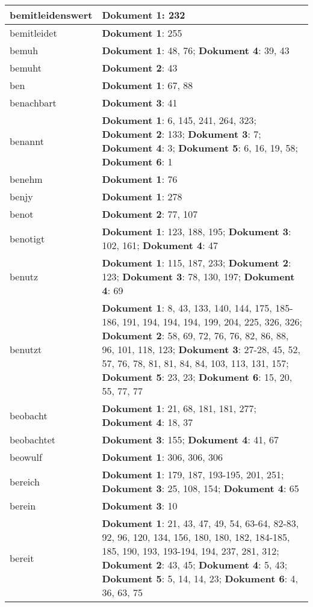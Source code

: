 \documentclass[a5paper]{article}
\begin{document}
\begin{longtable}[l]{|l|p{3in}|}
\hline
bemitleidenswert & \textbf{Dokument 1}: 232 \\
\hline
bemitleidet & \textbf{Dokument 1}: 255 \\
\hline
bemuh & \textbf{Dokument 1}: 48, 76; \textbf{Dokument 4}: 39, 43 \\
\hline
bemuht & \textbf{Dokument 2}: 43 \\
\hline
ben & \textbf{Dokument 1}: 67, 88 \\
\hline
benachbart & \textbf{Dokument 3}: 41 \\
\hline
benannt & \textbf{Dokument 1}: 6, 145, 241, 264, 323; \textbf{Dokument 2}: 133; \textbf{Dokument 3}: 7; \textbf{Dokument 4}: 3; \textbf{Dokument 5}: 6, 16, 19, 58; \textbf{Dokument 6}: 1 \\
\hline
benehm & \textbf{Dokument 1}: 76 \\
\hline
benjy & \textbf{Dokument 1}: 278 \\
\hline
benot & \textbf{Dokument 2}: 77, 107 \\
\hline
benotigt & \textbf{Dokument 1}: 123, 188, 195; \textbf{Dokument 3}: 102, 161; \textbf{Dokument 4}: 47 \\
\hline
benutz & \textbf{Dokument 1}: 115, 187, 233; \textbf{Dokument 2}: 123; \textbf{Dokument 3}: 78, 130, 197; \textbf{Dokument 4}: 69 \\
\hline
benutzt & \textbf{Dokument 1}: 8, 43, 133, 140, 144, 175, 185-186, 191, 194, 194, 194, 199, 204, 225, 326, 326; \textbf{Dokument 2}: 58, 69, 72, 76, 76, 82, 86, 88, 96, 101, 118, 123; \textbf{Dokument 3}: 27-28, 45, 52, 57, 76, 78, 81, 81, 84, 84, 103, 113, 131, 157; \textbf{Dokument 5}: 23, 23; \textbf{Dokument 6}: 15, 20, 55, 77, 77 \\
\hline
beobacht & \textbf{Dokument 1}: 21, 68, 181, 181, 277; \textbf{Dokument 4}: 18, 37 \\
\hline
beobachtet & \textbf{Dokument 3}: 155; \textbf{Dokument 4}: 41, 67 \\
\hline
beowulf & \textbf{Dokument 1}: 306, 306, 306 \\
\hline
bereich & \textbf{Dokument 1}: 179, 187, 193-195, 201, 251; \textbf{Dokument 3}: 25, 108, 154; \textbf{Dokument 4}: 65 \\
\hline
berein & \textbf{Dokument 3}: 10 \\
\hline
bereit & \textbf{Dokument 1}: 21, 43, 47, 49, 54, 63-64, 82-83, 92, 96, 120, 134, 156, 180, 180, 182, 184-185, 185, 190, 193, 193-194, 194, 237, 281, 312; \textbf{Dokument 2}: 43, 45; \textbf{Dokument 4}: 5, 43; \textbf{Dokument 5}: 5, 14, 14, 23; \textbf{Dokument 6}: 4, 36, 63, 75 \\

\end{longtable}
\end{document}
